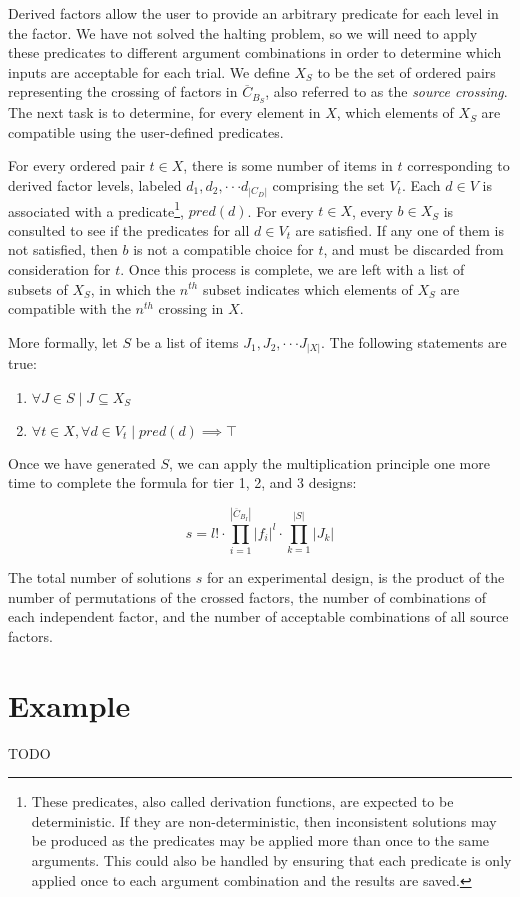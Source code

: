 Derived factors allow the user to provide an arbitrary predicate for each level in the factor. We have not solved the halting problem, so we will need to apply these predicates to different argument combinations in order to determine which inputs are acceptable for each trial. We define $X_S$ to be the set of ordered pairs representing the crossing of factors in $\overline{C}_{B_S}$, also referred to as the \textit{source crossing}. The next task is to determine, for every element in $X$, which elements of $X_S$ are compatible using the user-defined predicates.

For every ordered pair $t \in X$, there is some number of items in $t$ corresponding to derived factor levels, labeled $d_1, d_2, \cdot\cdot\cdot d_{|C_D|}$ comprising the set $V_t$. Each $d \in V$ is associated with a predicate\footnote{These predicates, also called derivation functions, are expected to be deterministic. If they are non-deterministic, then inconsistent solutions may be produced as the predicates may be applied more than once to the same arguments. This could also be handled by ensuring that each predicate is only applied once to each argument combination and the results are saved.}, $pred(d)$. For every $t \in X$, every $b \in X_S$ is consulted to see if the predicates for all $d \in V_t$ are satisfied. If any one of them is not satisfied, then $b$ is not a compatible choice for $t$, and must be discarded from consideration for $t$. Once this process is complete, we are left with a list of subsets of $X_S$, in which the $n^{th}$ subset indicates which elements of $X_S$ are compatible with the $n^{th}$ crossing in $X$.

More formally, let $S$ be a list of items $J_1, J_2, \cdot\cdot\cdot J_{|X|}$. The following statements are true:

\begin{enumerate}
\item $\forall J \in S \mid J \subseteq X_S$
\item $\forall t \in X,  \forall d \in V_t \mid pred(d) \implies \top$
\end{enumerate}

Once we have generated $S$, we can apply the multiplication principle one more time to complete the formula for tier 1, 2, and 3 designs:

\[
s = l! \cdot \prod_{i=1}^{|\overline{C}_{B_I}|} |f_i|^l \cdot \prod_{k=1}^{|S|} |J_k|
\]

The total number of solutions $s$ for an experimental design, is the product of the number of permutations of the crossed factors, the number of combinations of each independent factor, and the number of acceptable combinations of all source factors.


\section{Example}

TODO

